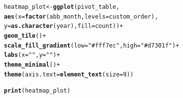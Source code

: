 \documentclass{article}\usepackage[]{graphicx}\usepackage[]{xcolor}
\makeatletter
\newcommand{\hlnum}[1]{\textcolor[rgb]{0.686,0.059,0.569}{#1}}%
\newcommand{\hlstr}[1]{\textcolor[rgb]{0.192,0.494,0.8}{#1}}%
\newcommand{\hlopt}[1]{\textcolor[rgb]{0,0,0}{#1}}%
\newcommand{\hlstd}[1]{\textcolor[rgb]{0.345,0.345,0.345}{#1}}%
\newcommand{\hlkwb}[1]{\textcolor[rgb]{0.69,0.353,0.396}{#1}}%
\newcommand{\hlkwc}[1]{\textcolor[rgb]{0.333,0.667,0.333}{#1}}%
\newcommand{\hlkwd}[1]{\textcolor[rgb]{0.737,0.353,0.396}{\textbf{#1}}}%
\newenvironment{kframe}{%
 \def\at@end@of@kframe{}%
 \ifinner\ifhmode%
  \def\at@end@of@kframe{\end{minipage}}%
  \begin{minipage}{\columnwidth}%
 \fi\fi%
 \def\FrameCommand##1{\hskip\@totalleftmargin \hskip-\fboxsep
 \colorbox{shadecolor}{##1}\hskip-\fboxsep
     \hskip-\linewidth \hskip-\@totalleftmargin \hskip\columnwidth}%
 \MakeFramed {\advance\hsize-\width
   \@totalleftmargin\z@ \linewidth\hsize
   \@setminipage}}%
 {\par\unskip\endMakeFramed%
 \at@end@of@kframe}
\newenvironment{knitrout}{}{} %
\makeatother
\begin{document}
\begin{knitrout}
\color{fgcolor}\begin{kframe}
\begin{alltt}
\hlstd{heatmap_plot} \hlkwb{<-} \hlkwd{ggplot}\hlstd{(pivot_table,}
                       \hlkwd{aes}\hlstd{(}\hlkwc{x} \hlstd{=} \hlkwd{factor}\hlstd{(abb_month,} \hlkwc{levels} \hlstd{= custom_order),}
                           \hlkwc{y} \hlstd{=} \hlkwd{as.character}\hlstd{(year),} \hlkwc{fill} \hlstd{= count))} \hlopt{+}
  \hlkwd{geom_tile}\hlstd{()} \hlopt{+}
  \hlkwd{scale_fill_gradient}\hlstd{(}\hlkwc{low} \hlstd{=} \hlstr{"#fff7ec"}\hlstd{,} \hlkwc{high} \hlstd{=} \hlstr{"#d7301f"}\hlstd{)} \hlopt{+}
  \hlkwd{labs}\hlstd{(}\hlkwc{x} \hlstd{=} \hlstr{" "}\hlstd{,} \hlkwc{y} \hlstd{=} \hlstr{" "}\hlstd{)} \hlopt{+}
  \hlkwd{theme_minimal}\hlstd{()} \hlopt{+}
  \hlkwd{theme}\hlstd{(}\hlkwc{axis.text} \hlstd{=} \hlkwd{element_text}\hlstd{(}\hlkwc{size} \hlstd{=} \hlnum{9}\hlstd{))}
\end{alltt}


{\ttfamily\noindent\bfseries\color{errorcolor}{\#\# Error in eval(expr, envir, enclos): object 'pivot\_table' not found}}\begin{alltt}
\hlkwd{print}\hlstd{(heatmap_plot)}
\end{alltt}


{\ttfamily\noindent\bfseries\color{errorcolor}{\#\# Error in eval(expr, envir, enclos): object 'heatmap\_plot' not found}}\end{kframe}
\end{knitrout}
\end{document}
